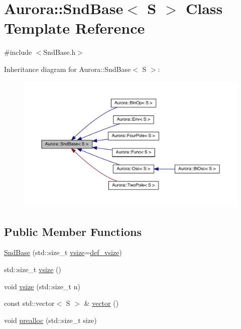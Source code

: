\hypertarget{class_aurora_1_1_snd_base}{}\section{Aurora\+:\+:Snd\+Base$<$ S $>$ Class Template Reference}
\label{class_aurora_1_1_snd_base}


{\ttfamily \#include $<$Snd\+Base.\+h$>$}



Inheritance diagram for Aurora\+:\+:Snd\+Base$<$ S $>$\+:\nopagebreak
\begin{figure}[H]
\begin{center}
\leavevmode
\includegraphics[width=350pt]{class_aurora_1_1_snd_base__inherit__graph}
\end{center}
\end{figure}
\subsection*{Public Member Functions}
\begin{DoxyCompactItemize}
\item 
\hyperlink{class_aurora_1_1_snd_base_a960739d3ae63df581c28f8801e589a3c}{Snd\+Base} (std\+::size\+\_\+t \hyperlink{class_aurora_1_1_snd_base_ad68387541cc3d696d0cf58d474f94b73}{vsize}=\hyperlink{namespace_aurora_afaaddf667a06e7ce23c667a8b7295263}{def\+\_\+vsize})
\item 
std\+::size\+\_\+t \hyperlink{class_aurora_1_1_snd_base_ad68387541cc3d696d0cf58d474f94b73}{vsize} ()
\item 
void \hyperlink{class_aurora_1_1_snd_base_a88dacba995eef179f2fc97e11a331913}{vsize} (std\+::size\+\_\+t n)
\item 
const std\+::vector$<$ S $>$ \& \hyperlink{class_aurora_1_1_snd_base_aecf7b916b5b459b5ac2855997fd2aec6}{vector} ()
\item 
void \hyperlink{class_aurora_1_1_snd_base_a5d57c3b735e5d583b4b4ae5f8e9cdf4c}{prealloc} (std\+::size\+\_\+t size)
\end{DoxyCompactItemize}
